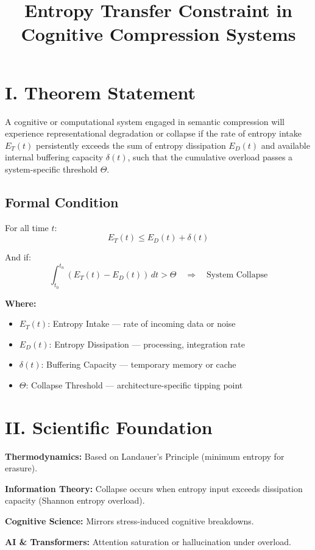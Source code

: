 \documentclass[12pt]{article}
\title{Entropy Transfer Constraint in Cognitive Compression Systems}
\author{}
\date{}
\begin{document}
\maketitle

\section*{I. Theorem Statement}

A cognitive or computational system engaged in semantic compression will experience representational degradation or collapse if the rate of entropy intake $E_T(t)$ persistently exceeds the sum of entropy dissipation $E_D(t)$ and available internal buffering capacity $\delta(t)$, such that the cumulative overload passes a system-specific threshold $\Theta$.

\subsection*{Formal Condition}

For all time $t$:
\[
E_T(t) \leq E_D(t) + \delta(t)
\]

And if:
\[
\int_{t_0}^{t_n} (E_T(t) - E_D(t)) \, dt > \Theta \quad \Rightarrow \quad \text{System Collapse}
\]

\textbf{Where:}
\begin{itemize}
  \item $E_T(t)$: Entropy Intake — rate of incoming data or noise
  \item $E_D(t)$: Entropy Dissipation — processing, integration rate
  \item $\delta(t)$: Buffering Capacity — temporary memory or cache
  \item $\Theta$: Collapse Threshold — architecture-specific tipping point
\end{itemize}

\section*{II. Scientific Foundation}

\textbf{Thermodynamics:} Based on Landauer's Principle (minimum entropy for erasure).

\textbf{Information Theory:} Collapse occurs when entropy input exceeds dissipation capacity (Shannon entropy overload).

\textbf{Cognitive Science:} Mirrors stress-induced cognitive breakdowns.

\textbf{AI & Transformers:} Attention saturation or hallucination under overload.
\end{document}
